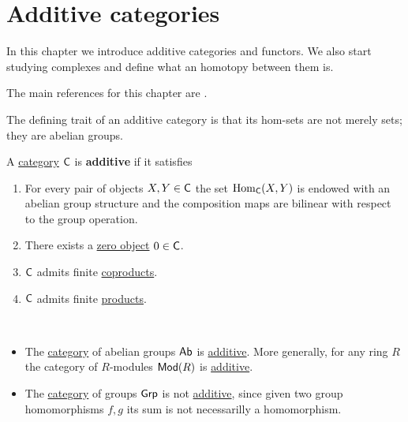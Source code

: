 \documentclass[../../main]{subfiles}
\begin{document}
\chapter{Additive categories}

In this chapter we introduce additive categories and functors.
We also start studying complexes and define what an homotopy between them is.

The main references for this chapter are \cite{weibelIntroductionHomologicalAlgebra1994, gelfandMethodsHomologicalAlgebra2003, aluffiAlgebraChapter02009}.

The defining trait of an additive category is that its hom-sets are not merely sets; they are abelian groups.
\begin{definition}\label{def:additive-category}
  A \hyperref[def:category]{category} \(\mathsf{C}\) is \textbf{additive} if it satisfies
  \begin{enumerate}[label=Ad.\arabic*), ref=Ad.\arabic*]
    \item\label{axiom:additive-hom} For every pair of objects \(X, Y \in \mathsf{C}\) the set \(\operatorname{Hom}_{\mathsf{C}}(X, Y)\) is endowed with an abelian group structure and the composition maps are bilinear with respect to the group operation.
    \item\label{axiom:additive-zero} There exists a \hyperref[def:zero-object]{zero object} \(0 \in \mathsf{C}\).
    \item\label{axiom:additive-coproducts} \(\mathsf{C}\) admits finite \hyperref[def:categorical-coproduct]{coproducts}.
    \item\label{axiom:additive-products} \(\mathsf{C}\) admits finite \hyperref[def:categorical-product]{products}.
  \end{enumerate}
\end{definition}

\begin{example}~
  \begin{itemize}
    \item The \hyperref[def:category]{category} of abelian groups \(\mathsf{Ab}\) is \hyperref[def:additive-category]{additive}.
          More generally, for any ring \(R\) the category of \(R\)-modules \(\mathsf{Mod}(R)\) is \hyperref[def:additive-category]{additive}.
    \item The \hyperref[def:category]{category} of groups \(\mathsf{Grp}\) is not \hyperref[def:additive-category]{additive}, since given two group homomorphisms \(f, g\) its sum is not necessarilly a homomorphism.
  \end{itemize}
\end{example}
\end{document}
